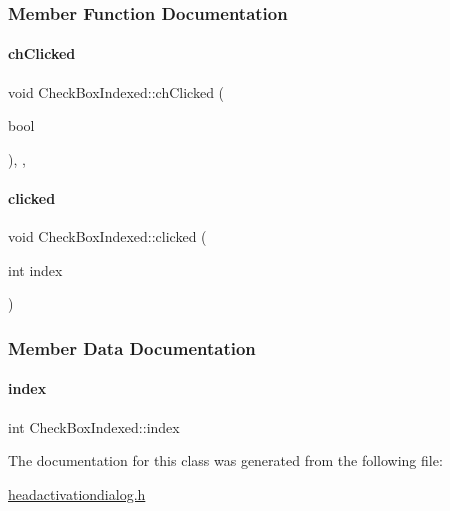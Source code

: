 \subsubsection{Member Function Documentation}
\mbox{\label{classCheckBoxIndexed_a103f5e490ee87326b823c6ccab56d83c}} 
\paragraph{\texorpdfstring{ch\+Clicked}{chClicked}}
{\footnotesize\ttfamily void Check\+Box\+Indexed\+::ch\+Clicked (\begin{DoxyParamCaption}\item[{bool}]{ }\end{DoxyParamCaption})\hspace{0.3cm}{\ttfamily [inline]}, {\ttfamily [private]}, {\ttfamily [slot]}}

\mbox{\label{classCheckBoxIndexed_a47301b2594e820c3ecf73c83e2ed0838}} 
\paragraph{\texorpdfstring{clicked}{clicked}}
{\footnotesize\ttfamily void Check\+Box\+Indexed\+::clicked (\begin{DoxyParamCaption}\item[{int}]{index }\end{DoxyParamCaption})\hspace{0.3cm}{\ttfamily [signal]}}



\subsubsection{Member Data Documentation}
\mbox{\label{classCheckBoxIndexed_a044019936afecec6b18af69da0bf7c41}} 
\paragraph{\texorpdfstring{index}{index}}
{\footnotesize\ttfamily int Check\+Box\+Indexed\+::index\hspace{0.3cm}{\ttfamily [private]}}



The documentation for this class was generated from the following file\+:\begin{DoxyCompactItemize}
\item 
\mbox{\hyperlink{headactivationdialog_8h}{headactivationdialog.\+h}}\end{DoxyCompactItemize}
